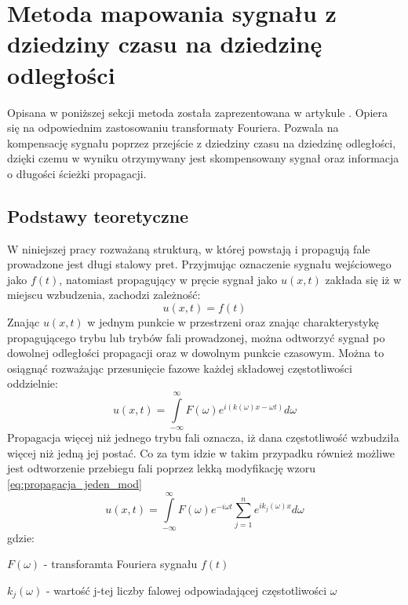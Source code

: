 \section{Metoda mapowania sygnału z dziedziny czasu na dziedzinę odległości}
\label{sec:Wilcox}

Opisana w poniższej sekcji metoda została zaprezentowana w artykule \cite{kasia1}. Opiera się na odpowiednim zastosowaniu transformaty Fouriera. Pozwala na kompensację sygnału poprzez przejście z dziedziny czasu na dziedzinę odległości, dzięki czemu w wyniku otrzymywany jest skompensowany sygnał oraz informacja o długości ścieżki propagacji.

\subsection{Podstawy teoretyczne}

W niniejszej pracy rozważaną strukturą, w której powstają i propagują fale prowadzone jest długi stalowy pret. Przyjmując oznaczenie sygnału wejściowego jako $f(t)$, natomiast propagujący w pręcie sygnał jako $u(x,t)$ zakłada się iż w miejscu wzbudzenia, zachodzi zależność: 
\begin{equation}
u(x,t) = f(t)
\end{equation}
Znając $u(x,t)$ w jednym punkcie w przestrzeni oraz znając charakterystykę propagującego trybu lub trybów fali prowadzonej, można odtworzyć sygnał po dowolnej odległości propagacji oraz w dowolnym punkcie czasowym. Można to osiągnąć rozważając przesunięcie fazowe każdej składowej częstotliwości oddzielnie:
\begin{equation}
u(x,t) = \int\limits_{-\infty}^{\infty}F(\omega)e^{i(k(\omega)x - \omega t)}d\omega \label{eq:propagacja_jeden_mod}
\end{equation}
Propagacja więcej niż jednego trybu fali oznacza, iż dana częstotliwość wzbudziła więcej niż jedną jej postać. Co za tym idzie w takim przypadku również możliwe jest odtworzenie przebiegu fali poprzez lekką modyfikację wzoru \ref{eq:propagacja_jeden_mod}
\begin{equation}
u(x,t) = \int\limits_{-\infty}^{\infty}F(\omega)e^{ -i \omega t}\sum \limits _{j=1}^{n}e^{ik_j(\omega)x} d\omega\label{eq:propagacja_kilka_mod}
\end{equation}
gdzie:

$F(\omega)$ - transforamta Fouriera sygnału $f(t)$

$k_j(\omega)$ - wartość j-tej liczby falowej odpowiadającej częstotliwości $\omega$

